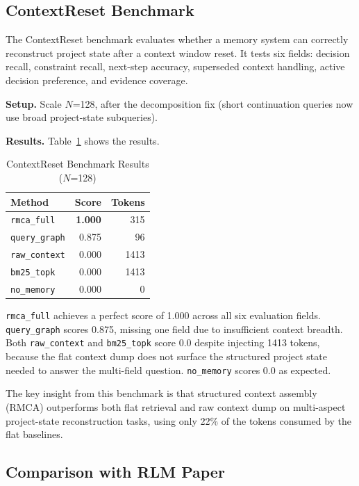 \documentclass[conference]{IEEEtran}
\begin{document}
\subsection{ContextReset Benchmark}

The ContextReset benchmark evaluates whether a memory system can correctly reconstruct
project state after a context window reset. It tests six fields: decision recall,
constraint recall, next-step accuracy, superseded context handling, active decision
preference, and evidence coverage.

\textbf{Setup.} Scale $N$=128, after the decomposition fix (short continuation queries
now use broad project-state subqueries).

\textbf{Results.} Table~\ref{tab:context_reset} shows the results.

\begin{table}[htbp]
\caption{ContextReset Benchmark Results ($N$=128)}
\label{tab:context_reset}
\centering
\begin{tabular}{lrr}
\toprule
\textbf{Method} & \textbf{Score} & \textbf{Tokens} \\
\midrule
\texttt{rmca\_full}  & \textbf{1.000} & 315 \\
\texttt{query\_graph} & 0.875 & 96 \\
\texttt{raw\_context} & 0.000 & 1413 \\
\texttt{bm25\_topk}  & 0.000 & 1413 \\
\texttt{no\_memory}  & 0.000 & 0 \\
\bottomrule
\end{tabular}
\end{table}

\texttt{rmca\_full} achieves a perfect score of 1.000 across all six evaluation fields.
\texttt{query\_graph} scores 0.875, missing one field due to insufficient context breadth.
Both \texttt{raw\_context} and \texttt{bm25\_topk} score 0.0 despite injecting 1413 tokens,
because the flat context dump does not surface the structured project state needed to answer
the multi-field question. \texttt{no\_memory} scores 0.0 as expected.

The key insight from this benchmark is that structured context assembly (RMCA) outperforms
both flat retrieval and raw context dump on multi-aspect project-state reconstruction tasks,
using only 22\% of the tokens consumed by the flat baselines.

\subsection{Comparison with RLM Paper}
\end{document}
